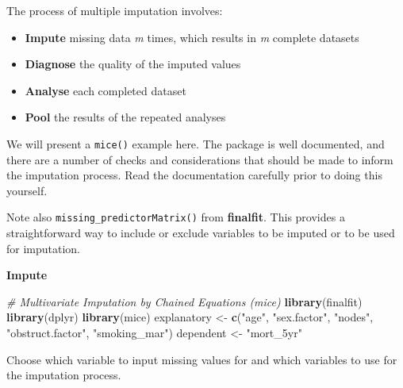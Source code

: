 \documentclass[
  12pt,
  krantz2]{krantz}
\makeatletter
\newenvironment{Shaded}{\begin{snugshade}}{\end{snugshade}}
\newcommand{\CommentTok}[1]{\textcolor[rgb]{0.56,0.35,0.01}{\textit{#1}}}
\newcommand{\DataTypeTok}[1]{\textcolor[rgb]{0.13,0.29,0.53}{#1}}
\newcommand{\KeywordTok}[1]{\textcolor[rgb]{0.13,0.29,0.53}{\textbf{#1}}}
\newcommand{\NormalTok}[1]{#1}
\newcommand{\OperatorTok}[1]{\textcolor[rgb]{0.81,0.36,0.00}{\textbf{#1}}}
\newcommand{\StringTok}[1]{\textcolor[rgb]{0.31,0.60,0.02}{#1}}
\providecommand{\tightlist}{%
  \setlength{\itemsep}{0pt}\setlength{\parskip}{0pt}}
\newenvironment{kframe}{%
\medskip{}
\setlength{\fboxsep}{.8em}
 \def\at@end@of@kframe{}%
 \ifinner\ifhmode%
  \def\at@end@of@kframe{\end{minipage}}%
  \begin{minipage}{\columnwidth}%
 \fi\fi%
 \def\FrameCommand##1{\hskip\@totalleftmargin \hskip-\fboxsep
 \colorbox{shadecolor}{##1}\hskip-\fboxsep
     \hskip-\linewidth \hskip-\@totalleftmargin \hskip\columnwidth}%
 \MakeFramed {\advance\hsize-\width
   \@totalleftmargin\z@ \linewidth\hsize
   \@setminipage}}%
 {\par\unskip\endMakeFramed%
 \at@end@of@kframe}
\renewenvironment{Shaded}{\begin{kframe}}{\end{kframe}}
\makeatother
\begin{document}
The process of multiple imputation involves:

\begin{itemize}
\tightlist
\item
  \textbf{Impute} missing data \emph{m} times, which results in \emph{m} complete datasets
\item
  \textbf{Diagnose} the quality of the imputed values
\item
  \textbf{Analyse} each completed dataset
\item
  \textbf{Pool} the results of the repeated analyses
\end{itemize}

We will present a \texttt{mice()} example here.
The package is well documented, and there are a number of checks and considerations that should be made to inform the imputation process.
Read the documentation carefully prior to doing this yourself.

Note also \texttt{missing\_predictorMatrix()} from \textbf{finalfit}.
This provides a straightforward way to include or exclude variables to be imputed or to be used for imputation.

\textbf{Impute}

\begin{Shaded}
\begin{Highlighting}[]
\CommentTok{# Multivariate Imputation by Chained Equations (mice)}
\KeywordTok{library}\NormalTok{(finalfit)}
\KeywordTok{library}\NormalTok{(dplyr)}
\KeywordTok{library}\NormalTok{(mice)}
\NormalTok{explanatory <-}\StringTok{ }\KeywordTok{c}\NormalTok{(}\StringTok{"age"}\NormalTok{, }\StringTok{"sex.factor"}\NormalTok{, }
                 \StringTok{"nodes"}\NormalTok{, }\StringTok{"obstruct.factor"}\NormalTok{, }\StringTok{"smoking_mar"}\NormalTok{)}
\NormalTok{dependent <-}\StringTok{ "mort_5yr"}
\end{Highlighting}
\end{Shaded}

Choose which variable to input missing values for and which variables to use for the imputation process.

\begin{Shaded}
\end{Shaded}
\end{document}
